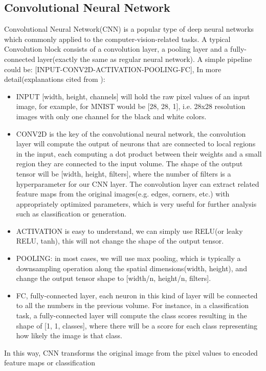 \subsection{Convolutional Neural Network}
Convolutional Neural Network(CNN) is a popular type of deep neural networks which commonly applied to 
the computer-vision-related tasks. 
A typical Convolution block consists of a convolution layer, a pooling layer and a 
fully-connected layer(exactly the same as regular neural network). A simple pipeline could be:
[INPUT-CONV2D-ACTIVATION-POOLING-FC], In more detail(explanations cited from \cite{cs231n}):
\begin{itemize}
    \item INPUT [width, height, channels] will hold the raw pixel values of an input image, for example, for MNIST
    would be [28, 28, 1], i.e. 28x28 resolution images with only one channel for the black and white colors.
    \item CONV2D is the key of the convolutional neural network, the convolution layer 
    will compute the output of neurons that are connected to local regions in the input, each 
    computing a dot product between their weights and a small region they are connected to the input volume.
    The shape of the output tensor will be [width, height, filters], where the number of filters is a hyperparameter for our 
    CNN layer. The convolution layer can extract related feature maps from the original images(e.g. edges, corners, etc.)
    with appropriately optimized parameters, which is very useful for further analysis 
    such as classification or generation. 
    \item ACTIVATION is easy to understand, we can simply use RELU(or leaky RELU, tanh), this will not change 
    the shape of the output tensor.
    \item POOLING: in most cases, we will use max pooling, which is typically a downsampling operation along the 
    spatial dimensions(width, height), and change the output tensor shape to [width/n, height/n, filters].
    \item FC, fully-connected layer, each neuron in this kind of layer will be connected to 
    all the numbers in the previous volume.
    For instance, in a classification task, a fully-connected layer will compute the class scores 
    resulting in the shape of [1, 1, classes], where there will be a score for each class representing 
    how likely the image is that class.
\end{itemize}
In this way, CNN transforms the original image from the pixel values to encoded feature maps or classification 
